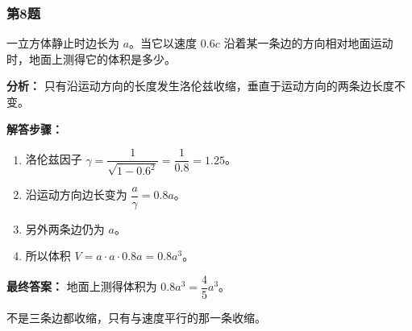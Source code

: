 \documentclass[12pt,a4paper]{ctexart}
\begin{document}
\subsubsection*{第8题}
\begin{tcolorbox}[colback=gray!2!white,colframe=black!60,title={题目}]
一立方体静止时边长为 \(a\)。当它以速度 \(0.6c\) 沿着某一条边的方向相对地面运动时，地面上测得它的体积是多少。\par
\end{tcolorbox}
\begin{tcolorbox}[colback=blue!2!white,colframe=blue!55!black,title={完整答案}]
\textbf{分析：}
只有沿运动方向的长度发生洛伦兹收缩，垂直于运动方向的两条边长度不变。\par
\textbf{解答步骤：}
\begin{enumerate}
\item 洛伦兹因子 \(\gamma=\dfrac{1}{\sqrt{1-0.6^2}}=\dfrac{1}{0.8}=1.25\)。
\item 沿运动方向边长变为 \(\dfrac{a}{\gamma}=0.8a\)。
\item 另外两条边仍为 \(a\)。
\item 所以体积 \(V=a\cdot a\cdot 0.8a=0.8a^3\)。
\end{enumerate}
\textbf{最终答案：}
地面上测得体积为 \(0.8a^3=\dfrac45 a^3\)。\par
\end{tcolorbox}
\begin{tcolorbox}[colback=red!2!white,colframe=red!55!black,title={易错点}]
不是三条边都收缩，只有与速度平行的那一条收缩。\par
\end{tcolorbox}
\end{document}
